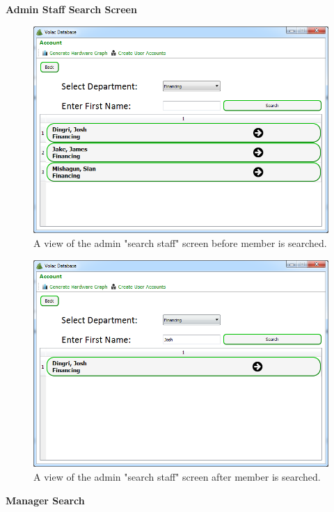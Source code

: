 \textbf{Admin Staff Search Screen}

\begin{figure}[H]
    \includegraphics[width=\textwidth]{./Evaluation/Images/beforeadv.png}
    \caption{A view of the admin "search staff" screen before member is searched.} 
\end{figure}

\begin{figure}[H]
    \includegraphics[width=\textwidth]{./Evaluation/Images/afteradv.png}
    \caption{A view of the admin "search staff" screen after member is searched.} 
\end{figure}

\textbf{Manager Search}

